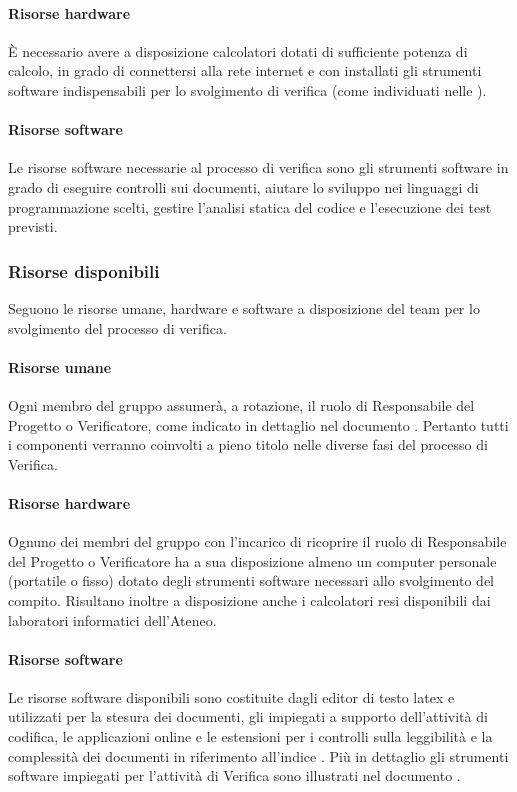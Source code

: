			\paragraph{Risorse hardware}
			  È necessario avere a disposizione calcolatori dotati di sufficiente potenza di calcolo, in grado di connettersi alla rete internet e con installati gli strumenti software indispensabili per lo svolgimento di verifica (come individuati nelle \NdP).
			\paragraph{Risorse software}
			Le risorse software necessarie al processo di verifica sono gli strumenti software in grado di eseguire controlli sui documenti, aiutare lo sviluppo nei linguaggi di programmazione scelti, gestire l'analisi statica del codice e l'esecuzione dei test previsti.
		\subsubsection{Risorse disponibili}
		Seguono le risorse umane, hardware e software a disposizione del team per lo svolgimento del processo di verifica.
			\paragraph{Risorse umane}
			Ogni membro del gruppo assumerà, a rotazione, il ruolo di Responsabile del Progetto o Verificatore, come indicato in dettaglio nel documento \PdP. Pertanto tutti i componenti verranno coinvolti a pieno titolo nelle diverse fasi del processo di Verifica.
			\paragraph{Risorse hardware}
			Ognuno dei membri del gruppo con l'incarico di ricoprire il ruolo di Responsabile del Progetto o Verificatore ha a sua disposizione almeno un computer personale (portatile o fisso) dotato degli strumenti software necessari allo svolgimento del compito. Risultano inoltre a disposizione anche i calcolatori resi disponibili dai laboratori informatici dell'Ateneo.
			\paragraph{Risorse software}
			Le risorse software disponibili sono costituite dagli editor di testo latex e utilizzati per la stesura dei documenti, gli  impiegati a supporto dell'attività di codifica, le applicazioni online e le estensioni per i controlli sulla leggibilità e la complessità dei documenti in riferimento all'indice . Più in dettaglio gli strumenti software impiegati per l'attività di Verifica sono illustrati nel documento \NdP.
